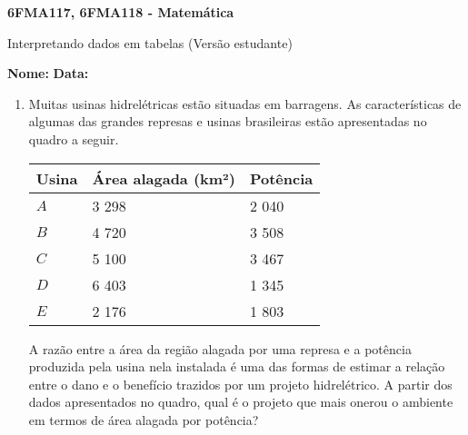 \documentclass[a4paper,14pt]{article}
\begin{document}
	
	\noindent\textbf{6FMA117, 6FMA118 - Matemática} 
	
	\begin{center}Interpretando dados em tabelas (Versão estudante)
	\end{center}
	
	\noindent\textbf{Nome:} \underline{\hspace{10cm}}
	\noindent\textbf{Data:} \underline{\hspace{4cm}}
	
	
	\begin{multicols}{2}
		\begin{enumerate} 
			\item Muitas usinas hidrelétricas estão situadas em barragens. As características de algumas das grandes represas e usinas brasileiras estão apresentadas no quadro a seguir.
			\begin{table}[H]
					\begin{tabular}{|p{2.4cm}|p{2.4cm}|p{2.4cm}|}
						\hline
						\textbf{Usina} & \textbf{Área alagada (km²)} & \textbf{Potência} \\ \hline
						$A$   & 3 298   & 2 040   \\ \hline
						$B$   & 4 720   & 3 508   \\ \hline
						$C$   & 5 100   & 3 467   \\ \hline
						$D$   & 6 403   & 1 345   \\ \hline
						$E$   & 2 176   & 1 803   \\ \hline
					\end{tabular}
			\end{table}
			A razão entre a área da região alagada por uma represa e a potência produzida pela usina nela instalada é uma das formas de estimar a relação entre o dano e o benefício trazidos por um projeto hidrelétrico. A partir dos dados apresentados no quadro, qual é o projeto que mais onerou o ambiente em termos de área alagada por potência? \\\\\\\\\\\\\\\\\\

\end{enumerate}
\end{multicols}
\end{document}

